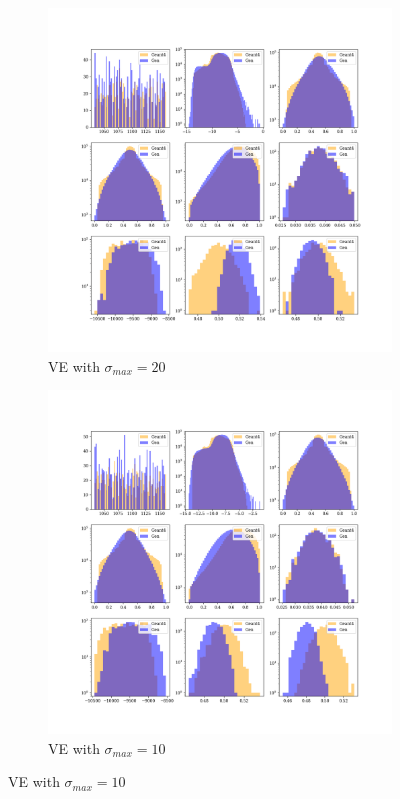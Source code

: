 \begin{figure}[htbp]
    \centering
    \begin{subfigure}[b]{0.4\textwidth} %
        \includegraphics[width=\textwidth]{Figures/ve_20.png}
        \caption{VE with $\sigma_{max} = 20$}
        \label{fig:ve_20}
    \end{subfigure}
    \hspace{0.015\textwidth} %
    \begin{subfigure}[b]{0.4\textwidth}
        \includegraphics[width=\textwidth]{Figures/ve_10.png}
        \caption{VE with $\sigma_{max} = 10$}
        \label{fig:ve_10}
    \end{subfigure}
    

\end{figure}
